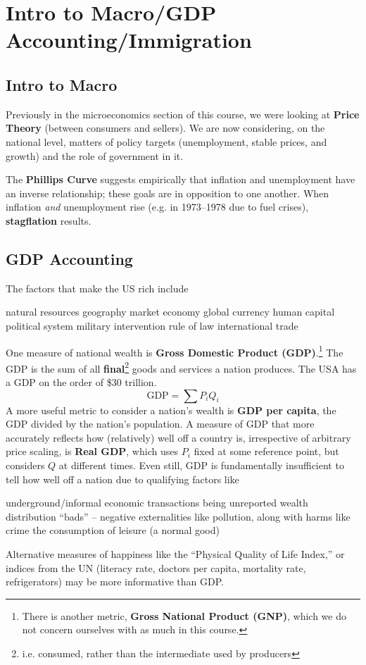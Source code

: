 \documentclass{article}
\begin{document}
\section{Intro to Macro/GDP Accounting/Immigration}
\subsection{Intro to Macro}
Previously in the microeconomics section of this course, we were looking at \textbf{Price Theory} (between consumers and sellers). We are now considering, on the national level, matters of policy targets (unemployment, stable prices, and growth) and the role of government in it.

The \textbf{Phillips Curve} suggests empirically that inflation and unemployment have an inverse relationship; these goals are in opposition to one another. When inflation \textit{and} unemployment rise (e.g. in 1973--1978 due to fuel crises), \textbf{stagflation} results.
\subsection{GDP Accounting}
The factors that make the US rich include
\begin{outline}
	\1 natural resources
	\1 geography
	\1 market economy
	\1 global currency
	\1 human capital
	\1 political system
	\1 military intervention
	\1 rule of law
	\1 international trade
\end{outline}
One measure of national wealth is \textbf{Gross Domestic Product (GDP)}.\footnote{There is another metric, \textbf{Gross National Product (GNP)}, which we do not concern ourselves with as much in this course.} The GDP is the sum of all \textbf{final}\footnote{i.e. consumed, rather than the intermediate used by producers} goods and services a nation produces. The USA has a GDP on the order of \$30 trillion.
\[
    \textrm{GDP} = \sum P_iQ_i
\]
A more useful metric to consider a nation's wealth is \textbf{GDP per capita}, the GDP divided by the nation's population. A measure of GDP that more accurately reflects how (relatively) well off a country is, irrespective of arbitrary price scaling, is \textbf{Real GDP}, which uses $P_i$ fixed at some reference point, but considers $Q$ at different times. Even still, GDP is fundamentally insufficient to tell how well off a nation due to qualifying factors like
\begin{outline}
	\1 underground/informal economic transactions being unreported
	\1 wealth distribution
	\1 ``bads'' -- negative externalities like pollution, along with harms like crime
	\1 the consumption of leisure (a normal good)
\end{outline}
Alternative measures of happiness like the ``Physical Quality of Life Index,'' or indices from the UN (literacy rate, doctors per capita, mortality rate, refrigerators) may be more informative than GDP.
\end{document}

